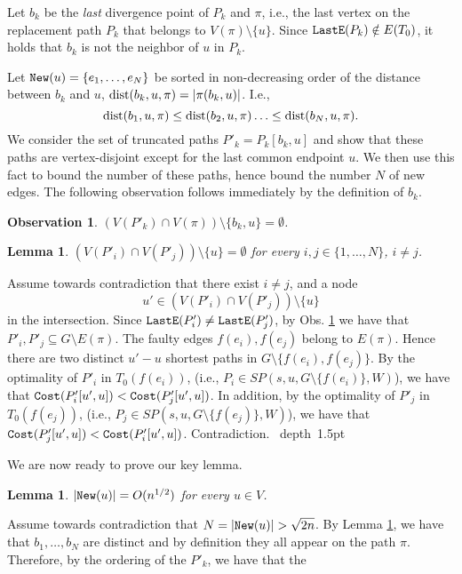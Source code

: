 \documentclass[12pt]{article}
\newtheorem{lemma}[theorem]{Lemma}
\newtheorem{observation}[theorem]{Observation}
\def\Cost{\mbox{\tt Cost}}
\newcommand{\dist}{\mbox{\rm dist}}
\def\Proof{\par\noindent{\bf Proof:~}}
\def\blackslug{\hbox{\hskip 1pt \vrule width 4pt height 8pt
    depth 1.5pt \hskip 1pt}}
\def\QED{\quad\blackslug\lower 8.5pt\null\par}
\newcommand{\New}[0]{\mbox{\tt New}}
\def\LastE{\mbox{\tt LastE}}
\begin{document}
Let $b_k$ be the \emph{last} divergence point of
$P_k$ and $\pi$, i.e., the last vertex on the
replacement path $P_k$ that belongs to
$V(\pi)\setminus \{u\}$.
Since $\LastE(P_k) \notin E(T_0)$,
it holds that $b_k$ is not the neighbor of $u$ in $P_k$.
\par Let $\New(u)=\{e_1, \ldots, e_N\}$ be sorted in non-decreasing order
of the distance between $b_k$ and $u$, $\dist(b_{k}, u,\pi)=|\pi(b_k, u)|$.
I.e.,
\begin{equation}
\label{eq:order}
\dist(b_1, u,\pi)\leq \dist(b_2, u,\pi) \ldots \leq \dist(b_N, u,\pi).
\end{equation}
We consider the set of truncated paths $P'_k=P_k[b_k, u]$ and show that these paths are vertex-disjoint except for the last common endpoint $u$.
We then use this fact to bound the number of these paths, hence bound the number $N$ of new edges. The following observation follows immediately by the definition of $b_k$.
\begin{observation}
\label{obs:notinpath}
$(V(P'_k)\cap V(\pi)) \setminus \{b_k,u\}=\emptyset$.
\end{observation}
\begin{lemma}
\label{cl:disjointpathmulti}
$\left(V(P'_i)\cap V(P'_j) \right) \setminus \{u\}=\emptyset$ for every
$i,j \in \{1, \ldots, N\}$, $i \neq j$.
\end{lemma}
\Proof
Assume towards contradiction that there exist $i \neq j$, and a node
$$u' \in \left(V(P'_i)\cap V(P'_j) \right) \setminus \{u\}$$ in the intersection.
Since $\LastE(P'_i)\neq \LastE(P'_j)$, by Obs. \ref{obs:notinpath} we have that $P'_i,P'_j \subseteq G \setminus E(\pi)$.
The faulty edges $f(e_i), f(e_j)$ belong to $E(\pi)$.
Hence there are two distinct $u'-u$ shortest paths in $G \setminus \{f(e_i), f(e_j)\}$.
By the optimality of $P'_i$ in $T_0(f(e_i))$,
(i.e., $P_i \in SP(s, u, G \setminus \{f(e_i)\},W)$), we have that
$\Cost(P'_i[u',u])<\Cost(P'_j[u',u])$.
In addition, by the optimality of
$P'_j$ in $T_0(f(e_j))$, (i.e., $P_j \in SP(s, u, G \setminus \{f(e_j)\},W)$),
we have that $\Cost(P'_j[u',u])<\Cost(P'_i[u',u])$.
Contradiction.
\QED
We are now ready to prove our key lemma.
\begin{lemma}
\label{lem:upper_bound}
$|\New(u)|=O(n^{1/2})$ for every $u \in V$.
\end{lemma}
\Proof
Assume towards contradiction that $N=|\New(u)|>\sqrt{2n}$.
By Lemma \ref{cl:disjointpathmulti}, we have that $b_1, \ldots, b_N$ are distinct and by definition they all appear on the path $\pi$.
Therefore, by the ordering of the $P'_k$, we have that the
\end{document}
